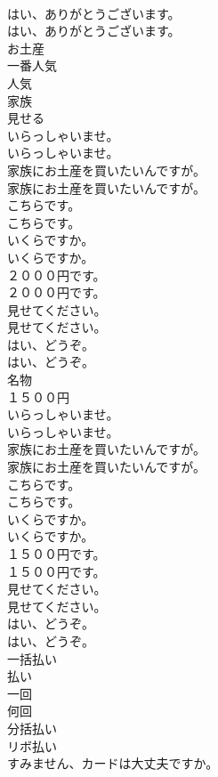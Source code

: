\documentclass[8pt]{extreport}
\begin{document}
\begin{CJK}{UTF8}{min}
\\	はい、ありがとうございます。	
\\	はい、ありがとうございます。 
\\	お土産
\\	一番人気
\\	人気
\\	家族
\\	見せる
\\	いらっしゃいませ。	
\\	いらっしゃいませ。 
\\	家族にお土産を買いたいんですが。	
\\	家族にお土産を買いたいんですが。 
\\	こちらです。	
\\	こちらです。 
\\	いくらですか。	
\\	いくらですか。 
\\	２０００円です。	
\\	２０００円です。 
\\	見せてください。	
\\	見せてください。 
\\	はい、どうぞ。	
\\	はい、どうぞ。 
\\	名物
\\	１５００円
\\	いらっしゃいませ。	
\\	いらっしゃいませ。 
\\	家族にお土産を買いたいんですが。	
\\	家族にお土産を買いたいんですが。 
\\	こちらです。	
\\	こちらです。 
\\	いくらですか。	
\\	いくらですか。 
\\	１５００円です。	
\\	１５００円です。 
\\	見せてください。	
\\	見せてください。 
\\	はい、どうぞ。	
\\	はい、どうぞ。 
\\	一括払い
\\	払い
\\	一回
\\	何回
\\	分括払い
\\	リボ払い
\\	すみません、カードは大丈夫ですか。	

\end{CJK}
\end{document}
